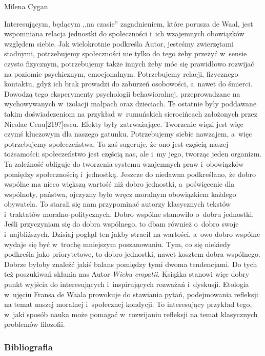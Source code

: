 \begin{recplenv}{Milena Cygan}
\enlargethispage{-.5\baselineskip}

Interesującym, będącym ,,na czasie'' zagadnieniem, które porusza de Waal, jest wspomniana relacja jednostki do
społeczności i~ich wzajemnych obowiązków względem siebie. Jak wielokrotnie podkreśla Autor, jesteśmy zwierzętami
stadnymi, potrzebujemy społeczności nie tylko do tego żeby przeżyć w~sensie czysto fizycznym, potrzebujemy także innych
żeby móc się prawidłowo rozwijać na poziomie psychicznym, emocjonalnym. Potrzebujemy relacji, fizycznego kontaktu, gdyż
ich brak prowadzi do zaburzeń osobowości, a~nawet do śmierci. Dowodzą tego eksperymenty psychologii behawioralnej,
przeprowadzane na wychowywanych w~izolacji małpach oraz dzieciach. Te ostatnie były poddawane takim doświadczeniom na
przykład w~rumuńskich sierocińcach założonych przez Nicolae Ceau[219?]escu. Efekty były zatrważające. Tworzenie więzi
jest więc czymś kluczowym dla naszego gatunku. Potrzebujemy siebie nawzajem, a~więc potrzebujemy społeczeństwa. To zaś
sugeruje, że ono jest częścią naszej tożsamości: społeczeństwo jest częścią nas, ale i~my jego, tworząc jeden organizm.
Ta zależność obliguje do tworzenia systemu wzajemnych praw i~obowiązków pomiędzy społecznością i~jednostką. Jeszcze do
niedawna podkreślano, że dobro wspólne ma nieco większą wartość niż dobro jednostki, a~poświęcenie dla wspólnoty,
państwa, ojczyzny było wręcz moralnym obowiązkiem każdego obywatela. To starali się nam przypominać autorzy klasycznych
tekstów i~traktatów moralno-politycznych. Dobro wspólne stanowiło o~dobru jednostki. Jeśli przyczyniam się do dobra
wspólnego, to dbam również o~dobro swoje i~najbliższych. Dzisiaj pogląd ten jakby stracił na wartości, a~owo dobro
wspólne wydaje się być w~trochę mniejszym poszanowaniu. Tym, co się niekiedy podkreśla jako priorytetowe, to dobro
jednostki, nawet kosztem dobra wspólnego. Dobrze byłoby znaleźć jakiś balans pomiędzy tymi dwoma tendencjami. Do tych
też poszukiwań skłania nas Autor \textit{Wieku empatii}. Książka stanowi więc dobry punkt wyjścia do
interesujących i~inspirujących rozważań i~dyskusji. Etologia w~ujęciu Fransa de Waala prowokuje do stawiania pytań, podejmowania
refleksji na temat naszej moralnej i~społecznej kondycji. To interesujący przykład tego, w~jaki sposób nauka może
pomagać w~rozwijaniu refleksji na temat klasycznych problemów filozofii.





\subsubsection{Bibliografia}\nopagebreak[4]
\end{recplenv}
